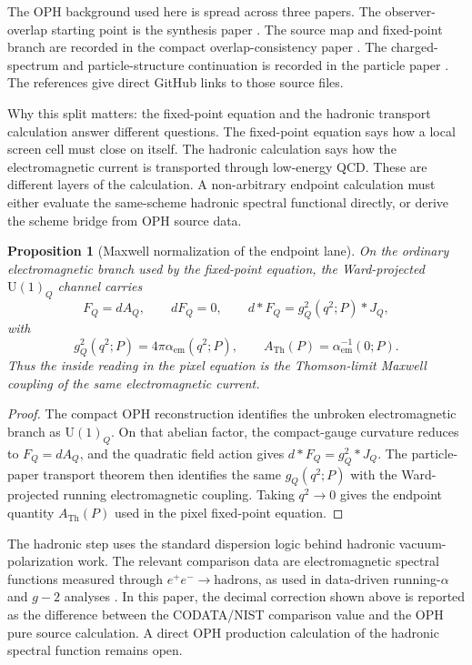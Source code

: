 \documentclass[11pt]{article}
\newtheorem{proposition}{Proposition}
\theoremstyle{remark}
\newcommand{\U}{\mathrm{U}}
\newcommand{\ATh}{A_{\mathrm{Th}}}
\begin{document}
The OPH background used here is spread across three papers. The observer-overlap starting point is the synthesis paper \cite{oph-synthesis}. The source map and fixed-point branch are recorded in the compact overlap-consistency paper \cite{oph-smgr}. The charged-spectrum and particle-structure continuation is recorded in the particle paper \cite{oph-particle}. The references give direct GitHub links to those source files.

Why this split matters: the fixed-point equation and the hadronic transport calculation answer different questions. The fixed-point equation says how a local screen cell must close on itself. The hadronic calculation says how the electromagnetic current is transported through low-energy QCD. These are different layers of the calculation. A non-arbitrary endpoint calculation must either evaluate the same-scheme hadronic spectral functional directly, or derive the scheme bridge from OPH source data.

\begin{proposition}[Maxwell normalization of the endpoint lane]
On the ordinary electromagnetic branch used by the fixed-point equation, the Ward-projected
\(\U(1)_Q\) channel carries
\[
F_Q=dA_Q,\qquad dF_Q=0,\qquad d{*}F_Q=g_Q^2(q^2;P){*}J_Q,
\]
with
\[
g_Q^2(q^2;P)=4\pi\alpha_{\mathrm{em}}(q^2;P),
\qquad
\ATh(P)=\alpha_{\mathrm{em}}^{-1}(0;P).
\]
Thus the inside reading in the pixel equation is the Thomson-limit Maxwell coupling of the same
electromagnetic current.
\end{proposition}

\begin{proof}
The compact OPH reconstruction identifies the unbroken electromagnetic branch as \(\U(1)_Q\).
On that abelian factor, the compact-gauge curvature reduces to \(F_Q=dA_Q\), and the quadratic
field action gives \(d{*}F_Q=g_Q^2{*}J_Q\). The particle-paper transport theorem then identifies
the same \(g_Q(q^2;P)\) with the Ward-projected running electromagnetic coupling. Taking
\(q^2\to0\) gives the endpoint quantity \(\ATh(P)\) used in the pixel fixed-point equation.
\end{proof}

The hadronic step uses the standard dispersion logic behind hadronic vacuum-polarization work. The relevant comparison data are electromagnetic spectral functions measured through \(e^+e^-\to\mathrm{hadrons}\), as used in data-driven running-\(\alpha\) and \(g-2\) analyses \cite{dhmz,knt19,pdg-xsect}. In this paper, the decimal correction shown above is reported as the difference between the CODATA/NIST comparison value and the OPH pure source calculation. A direct OPH production calculation of the hadronic spectral function remains open.
\end{document}
